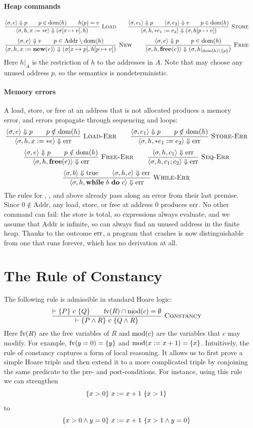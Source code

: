 \paragraph{Heap commands}
\[
  \dfrac{\langle \sigma,e\rangle\mathrel{\Downarrow} p\qquad p\in\operatorname{dom}(h)\qquad h(p)=v}{\langle \sigma,h,x:=\ast e\rangle\mathrel{\Downarrow}(\sigma[x\mapsto v],h)}\ \textsc{Load}
  \qquad
  \dfrac{\langle \sigma,e_1\rangle\mathrel{\Downarrow} p\qquad\langle \sigma,e_2\rangle\mathrel{\Downarrow} v\qquad p\in\operatorname{dom}(h)}{\langle \sigma,h,\ast e_1:=e_2\rangle\mathrel{\Downarrow}(\sigma,h[p\mapsto v])}\ \textsc{Store}
\]
\[
  \dfrac{\langle \sigma,e\rangle\mathrel{\Downarrow} v\qquad p\in\mathrm{Addr}\setminus\operatorname{dom}(h)}{\langle \sigma,h,x:=\mathbf{new}(e)\rangle\mathrel{\Downarrow}(\sigma[x\mapsto p],h[p\mapsto v])}\ \textsc{New}
  \qquad
  \dfrac{\langle \sigma,e\rangle\mathrel{\Downarrow} p\qquad p\in\operatorname{dom}(h)}{\langle \sigma,h,\mathbf{free}(e)\rangle\mathrel{\Downarrow}(\sigma,h|_{\operatorname{dom}(h)\setminus\{p\}})}\ \textsc{Free}
\]
Here $h|_A$ is the restriction of $h$ to the addresses in $A$. Note that  may choose any
unused address $p$, so the semantics is nondeterministic.
%
\paragraph{Memory errors} A load, store, or free at an address that is not allocated produces a
memory error, and errors propagate through sequencing and loops:
\[
  \dfrac{\langle \sigma,e\rangle\mathrel{\Downarrow} p\qquad p\notin\operatorname{dom}(h)}{\langle \sigma,h,x:=\ast e\rangle\mathrel{\Downarrow}\mathrm{err}}\ \textsc{Load-Err}
  \qquad
  \dfrac{\langle \sigma,e_1\rangle\mathrel{\Downarrow} p\qquad p\notin\operatorname{dom}(h)}{\langle \sigma,h,\ast e_1:=e_2\rangle\mathrel{\Downarrow}\mathrm{err}}\ \textsc{Store-Err}
\]
\[
  \dfrac{\langle \sigma,e\rangle\mathrel{\Downarrow} p\qquad p\notin\operatorname{dom}(h)}{\langle \sigma,h,\mathbf{free}(e)\rangle\mathrel{\Downarrow}\mathrm{err}}\ \textsc{Free-Err}
  \qquad
  \dfrac{\langle \sigma,h,c_1\rangle\mathrel{\Downarrow}\mathrm{err}}{\langle \sigma,h,c_1;c_2\rangle\mathrel{\Downarrow}\mathrm{err}}\ \textsc{Seq-Err}
\]
\[
  \infr{\ev{\sigma,b}\sem\mathrm{true}\qquad\ev{\sigma,h,c}\sem\err}
       {\ev{\sigma,h,\kw{while}\ b\ \kw{do}\ c}\sem\err}{While-Err}
\]
The rules for , , and  above already pass along an error from their
last premise. Since $0\notin\mathrm{Addr}$, any load, store, or free at address $0$ produces
$\mathrm{err}$. No other command can fail: the store is total, so expressions always evaluate, and we
assume that $\mathrm{Addr}$ is infinite, so  can always find an unused address in the
finite heap. Thanks to the outcome $\mathrm{err}$, a program that crashes is now distinguishable from one
that runs forever, which has no derivation at all.
%
\section{The Rule of Constancy}
%
The following rule is admissible in standard Hoare logic:
\[
  \dfrac{\vdash\{P\}\ c\ \{Q\}\qquad\mathrm{fv}(R)\cap\mathrm{mod}(c)=\emptyset}{\vdash\{P\wedge R\}\ c\ \{Q\wedge R\}}\ \textsc{Constancy}
\]
Here $\mathrm{fv}(R)$ are the free variables of $R$ and $\mathrm{mod}(c)$ are the variables that $c$ may modify.
For example, $\mathrm{fv}(y=0)=\{y\}$ and $\mathrm{mod}(x:=x+1)=\{x\}$.
%
Intuitively, the rule of constancy captures a form of local reasoning. It allows us to first prove
a simple Hoare triple and then extend it to a more complicated triple by conjoining the same
predicate to the pre- and post-conditions. For instance, using this rule we can strengthen
\[
  \{x>0\}\ x:=x+1\ \{x>1\}
\]
to
\[
  \{x>0\wedge y=0\}\ x:=x+1\ \{x>1\wedge y=0\}
\]
%
